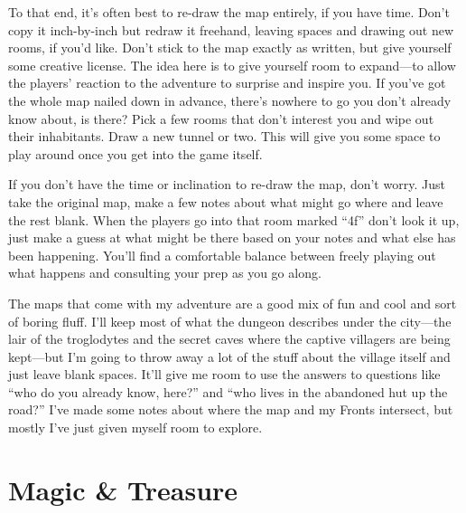   

To that end, it’s often best to re-draw the map entirely, if you have time. Don’t copy it inch-by-inch but redraw it freehand, leaving spaces and drawing out new rooms, if you’d like. Don’t stick to the map exactly as written, but give yourself some creative license. The idea here is to give yourself room to expand—to allow the players’ reaction to the adventure to surprise and inspire you. If you’ve got the whole map nailed down in advance, there’s nowhere to go you don’t already know about, is there? Pick a few rooms that don’t interest you and wipe out their inhabitants. Draw a new tunnel or two. This will give you some space to play around once you get into the game itself.

 

If you don’t have the time or inclination to re-draw the map, don’t worry. Just take the original map, make a few notes about what might go where and leave the rest blank. When the players go into that room marked “4f” don’t look it up, just make a guess at what might be there based on your notes and what else has been happening. You’ll find a comfortable balance between freely playing out what happens and consulting your prep as you go along.

 
\startExample
The maps that come with my adventure are a good mix of fun and cool and sort of boring fluff. I’ll keep most of what the dungeon describes under the city—the lair of the troglodytes and the secret caves where the captive villagers are being kept—but I’m going to throw away a lot of the stuff about the village itself and just leave blank spaces. It’ll give me room to use the answers to questions like “who do you already know, here?” and “who lives in the abandoned hut up the road?” I’ve made some notes about where the map and my Fronts intersect, but mostly I’ve just given myself room to explore.
\stopExample
 
\section{Magic \& Treasure}    \index{\&} 
 

